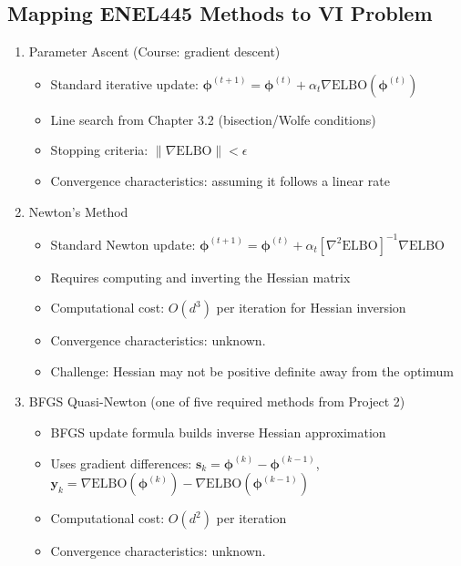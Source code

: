 \documentclass[11pt]{article}
\newcommand{\ELBO}{\text{ELBO}}
\begin{document}
\subsection*{Mapping ENEL445 Methods to VI Problem}

\begin{enumerate}[leftmargin=*]
\item Parameter Ascent (Course: gradient descent)
\begin{itemize}
\item Standard iterative update: $\bm{\phi}^{(t+1)} = \bm{\phi}^{(t)} + \alpha_t \nabla \ELBO(\bm{\phi}^{(t)})$
\item Line search from Chapter 3.2 (bisection/Wolfe conditions)
\item Stopping criteria: $\|\nabla \ELBO\| < \epsilon$
\item Convergence characteristics: assuming it follows a linear rate
\end{itemize}

\item Newton's Method   
\begin{itemize}
\item Standard Newton update: $\bm{\phi}^{(t+1)} = \bm{\phi}^{(t)} + \alpha_t [\nabla^2 \ELBO]^{-1} \nabla \ELBO$
\item Requires computing and inverting the Hessian matrix
\item Computational cost: $O(d^3)$ per iteration for Hessian inversion
\item Convergence characteristics: unknown. 
\item Challenge: Hessian may not be positive definite away from the optimum
\end{itemize}

\item BFGS Quasi-Newton (one of five required methods from Project 2)
\begin{itemize}
\item BFGS update formula builds inverse Hessian approximation
\item Uses gradient differences: $\bm{s}_k = \bm{\phi}^{(k)} - \bm{\phi}^{(k-1)}$, $\bm{y}_k = \nabla \ELBO(\bm{\phi}^{(k)}) - \nabla \ELBO(\bm{\phi}^{(k-1)})$ 
\item Computational cost: $O(d^2)$ per iteration
\item Convergence characteristics: unknown.  
\end{itemize}
\end{enumerate}
\end{document}
